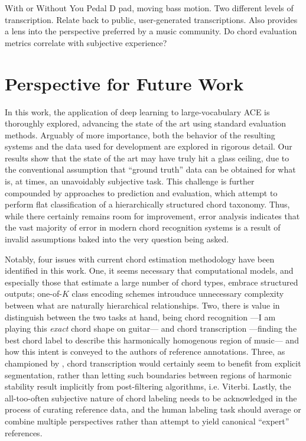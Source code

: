 \documentclass{article}
\begin{document}
With or Without You
Pedal D pad, moving bass motion.
Two different levels of transcription.
Relate back to public, user-generated transcriptions.
Also provides a lens into the perspective preferred by a music community.
Do chord evaluation metrics correlate with subjective experience?


\section{Perspective for Future Work}

In this work, the application of deep learning to large-vocabulary ACE is thoroughly explored, advancing the state of the art using standard evaluation methods.
Arguably of more importance, both the behavior of the resulting systems and the data used for development are explored in rigorous detail.
Our results show that the state of the art may have truly hit a glass ceiling, due to the conventional assumption that ``ground truth'' data can be obtained for what is, at times, an unavoidably subjective task.
This challenge is further compounded by approaches to prediction and evaluation, which attempt to perform flat classification of a hierarchically structured chord taxonomy.
Thus, while there certainly remains room for improvement, error analysis indicates that the vast majority of error in modern chord recognition systems is a result of invalid assumptions baked into the very question being asked.

Notably, four issues with current chord estimation methodology have been identified in this work.
One, it seems necessary that computational models, and especially those that estimate a large number of chord types, embrace structured outputs;
one-of-$K$ class encoding schemes introuduce unnecessary complexity between what are naturally hierarchical relationships.
Two, there is value in distinguish between the two tasks at hand, being chord recognition ---I am playing this \emph{exact} chord shape on guitar--- and chord transcription ---finding the best chord label to describe this harmonically homogenous region of music--- and how this intent is conveyed to the authors of reference annotations.
Three, as championed by \cite{Mauch}, chord transcription would certainly seem to benefit from explicit segmentation, rather than letting such boundaries between regions of harmonic stability result implicitly from post-filtering algorithms, i.e. Viterbi.
Lastly, the all-too-often subjective nature of chord labeling needs to be acknowledged in the process of curating reference data, and the human labeling task should average or combine multiple perspectives rather than attempt to yield canonical ``expert'' references.
\end{document}
